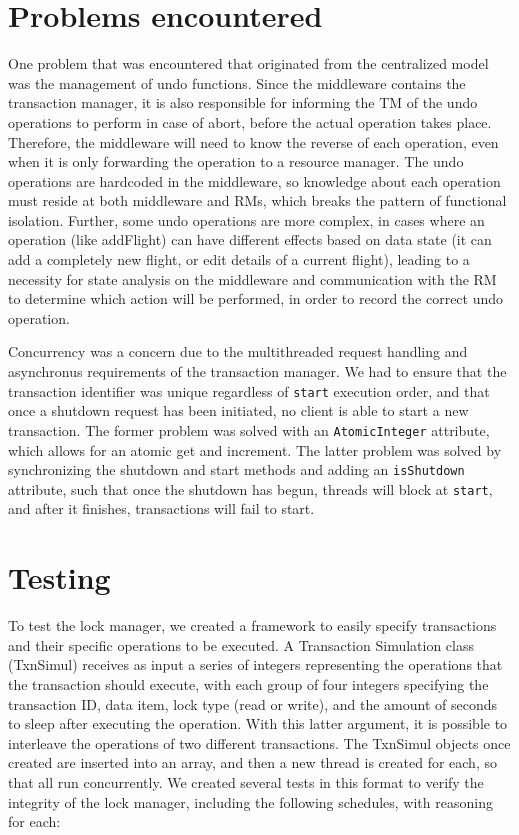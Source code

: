 \documentclass[11pt]{article}
\begin{document}
\section*{Problems encountered}

One problem that was encountered that originated from the centralized model was the management of undo functions. Since the middleware contains the transaction manager, it is also responsible for informing the TM of the undo operations to perform in case of abort, before the actual operation takes place. Therefore, the middleware will need to know the reverse of each operation, even when it is only forwarding the operation to a resource manager. The undo operations are hardcoded in the middleware, so knowledge about each operation must reside at both middleware and RMs, which breaks the pattern of functional isolation. Further, some undo operations are more complex, in cases where an operation (like addFlight) can have different effects based on data state (it can add a completely new flight, or edit details of a current flight), leading to a necessity for state analysis on the middleware and communication with the RM to determine which action will be performed, in order to record the correct undo operation. \par

Concurrency was a concern due to the multithreaded request handling and asynchronus requirements of the transaction manager. We had to ensure that the transaction identifier was unique regardless of \texttt{start} execution order, and that once a shutdown request has been initiated, no client is able to start a new transaction. The former problem was solved with an \texttt{AtomicInteger} attribute, which allows for an atomic get and increment. The latter problem was solved by synchronizing the shutdown and start methods and adding an \texttt{isShutdown} attribute, such that once the shutdown has begun, threads will block at \texttt{start}, and after it finishes, transactions will fail to start. \par

\section*{Testing}

To test the lock manager, we created a framework to easily specify transactions and their specific operations to be executed. A Transaction Simulation class (TxnSimul) receives as input a series of integers representing the operations that the transaction should execute, with each group of four integers specifying the transaction ID, data item, lock type (read or write), and the amount of seconds to sleep after executing the operation. With this latter argument, it is possible to interleave the operations of two different transactions. The TxnSimul objects once created are inserted into an array, and then a new thread is created for each, so that all run concurrently. We created several tests in this format to verify the integrity of the lock manager, including the following schedules, with reasoning for each:
\end{document}
